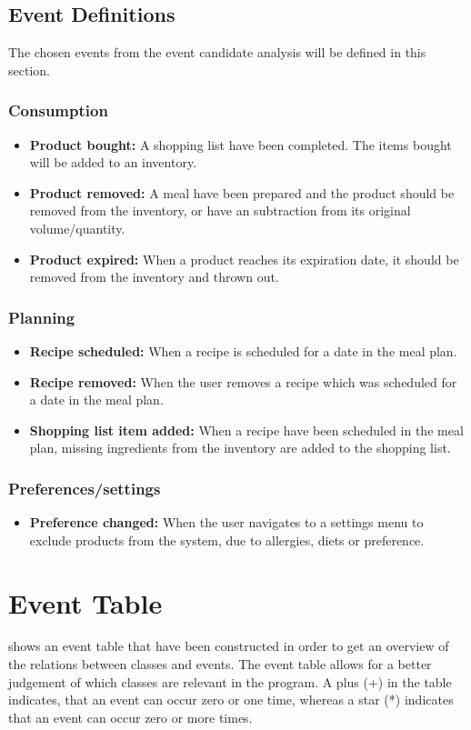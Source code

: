 \subsection{Event Definitions}
The chosen events from the event candidate analysis will be defined in this section.
\subsubsection{Consumption}
\begin{itemize}
\item \textbf{Product bought:} A shopping list have been completed. The items bought will be added to an inventory.
\item \textbf{Product removed:} A meal have been prepared and the product should be removed from the inventory, or have an subtraction from its original volume/quantity.
\item \textbf{Product expired:} When a product reaches its expiration date, it should be removed from the inventory and thrown out.
\end{itemize}

\subsubsection{Planning}
\begin{itemize}
    \item \textbf{Recipe scheduled:} When a recipe is scheduled for a date in the meal plan.
    \item \textbf{Recipe removed:} When the user removes a recipe which was scheduled for a date in the meal plan.
    \item \textbf{Shopping list item added:} When a recipe have been scheduled in the meal plan, missing ingredients from the inventory are added to the shopping list.
\end{itemize}

\subsubsection{Preferences/settings}
\begin{itemize}
\item \textbf{Preference changed:} When the user navigates to a settings menu to exclude products from the system, due to allergies, diets or preference.
\end{itemize}

\section{Event Table}
 shows an event table that have been constructed in order to get an overview of the relations between classes and events. The event table allows for a better judgement of which classes are relevant in the program. A plus (+) in the table indicates, that an event can occur zero or one time, whereas a star (*) indicates that an event can occur zero or more times.

